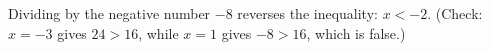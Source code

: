 Dividing by the negative number $-8$ reverses the inequality: $\boxed{x<-2}$. (Check: $x=-3$ gives $24>16$, while $x=1$ gives $-8>16$, which is false.)
